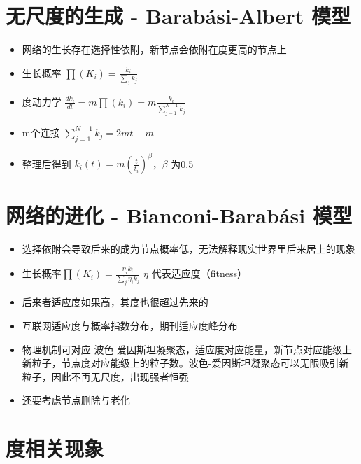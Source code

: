 \documentclass[
]{book}
\providecommand{\tightlist}{%
  \setlength{\itemsep}{0pt}\setlength{\parskip}{0pt}}
\begin{document}
\hypertarget{ux65e0ux5c3aux5ea6ux7684ux751fux6210---barabuxe1si-albert-ux6a21ux578b}{%
\section{无尺度的生成 - Barabási-Albert 模型}\label{ux65e0ux5c3aux5ea6ux7684ux751fux6210---barabuxe1si-albert-ux6a21ux578b}}

\begin{itemize}
\tightlist
\item
  网络的生长存在选择性依附，新节点会依附在度更高的节点上
\item
  生长概率 \(\prod (K_i) = \frac{k_i}{\sum_jk_j}\)
\item
  度动力学 \(\frac{dk_i}{dt} = m\prod(k_i) = m\frac{k_i}{\sum_{j=1}^{N-1}k_j}\)
\item
  m个连接 \(\sum_{j=1}^{N-1}k_j = 2mt-m\)
\item
  整理后得到 \(k_i(t) = m(\frac{t}{t_i})^{\beta}\)，\(\beta\) 为0.5
\end{itemize}

\hypertarget{ux7f51ux7edcux7684ux8fdbux5316---bianconi-barabuxe1si-ux6a21ux578b}{%
\section{网络的进化 - Bianconi-Barabási 模型}\label{ux7f51ux7edcux7684ux8fdbux5316---bianconi-barabuxe1si-ux6a21ux578b}}

\begin{itemize}
\tightlist
\item
  选择依附会导致后来的成为节点概率低，无法解释现实世界里后来居上的现象
\item
  生长概率\(\prod (K_i) = \frac{\eta_ik_i}{\sum_j\eta_i k_j}\) \(\eta\) 代表适应度（fitness）
\item
  后来者适应度如果高，其度也很超过先来的
\item
  互联网适应度与概率指数分布，期刊适应度峰分布
\item
  物理机制可对应 波色-爱因斯坦凝聚态，适应度对应能量，新节点对应能级上新粒子，节点度对应能级上的粒子数。波色-爱因斯坦凝聚态可以无限吸引新粒子，因此不再无尺度，出现强者恒强
\item
  还要考虑节点删除与老化
\end{itemize}

\hypertarget{ux5ea6ux76f8ux5173ux73b0ux8c61}{%
\section{度相关现象}\label{ux5ea6ux76f8ux5173ux73b0ux8c61}}
\end{document}
